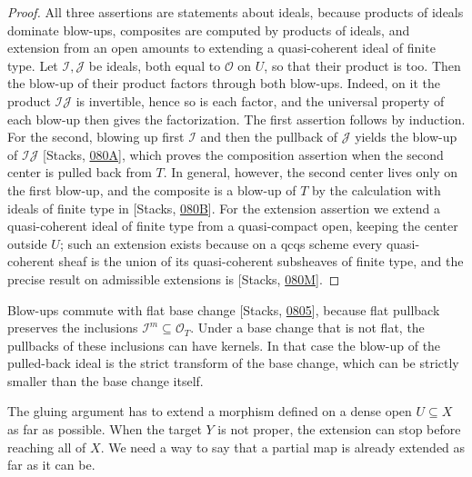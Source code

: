 \documentclass[11pt]{article}
\begin{document}
\begin{proof}[{Proof}]\label{bp36}%
All three assertions are statements about ideals, because products of ideals dominate blow-ups, composites are computed by products of ideals, and extension from an open amounts to extending a quasi-coherent ideal of finite type. Let \(\mathcal I,\mathcal J\) be ideals, both equal to \(\mathcal O\) on \(U\), so that their product is too. Then the blow-up of their product factors through both blow-ups. Indeed, on it the product \(\mathcal I\mathcal J\) is invertible, hence so is each factor, and the universal property of each blow-up then gives the factorization. The first assertion follows by induction. For the second, blowing up first \(\mathcal I\) and then the pullback of \(\mathcal J\) yields the blow-up of \(\mathcal I\mathcal J\) [Stacks, \href{https://stacks.math.columbia.edu/tag/080A}{080A}], which proves the composition assertion when the second center is pulled back from \(T\). In general, however, the second center lives only on the first blow-up, and the composite is a blow-up of \(T\) by the calculation with ideals of finite type in [Stacks, \href{https://stacks.math.columbia.edu/tag/080B}{080B}]. For the extension assertion we extend a quasi-coherent ideal of finite type from a quasi-compact open, keeping the center outside \(U\); such an extension exists because on a qcqs scheme every quasi-coherent sheaf is the union of its quasi-coherent subsheaves of finite type, and the precise result on admissible extensions is [Stacks, \href{https://stacks.math.columbia.edu/tag/080M}{080M}].
\end{proof}

\label{bp37}%
Blow-ups commute with flat base change [Stacks, \href{https://stacks.math.columbia.edu/tag/0805}{0805}], because flat pullback preserves the inclusions \(\mathcal I^m\subseteq\mathcal O_T\). Under a base change that is not flat, the pullbacks of these inclusions can have kernels. In that case the blow-up of the pulled-back ideal is the strict transform of the base change, which can be strictly smaller than the base change itself.

The gluing argument has to extend a morphism defined on a dense open \(U\subseteq X\) as far as possible. When the target \(Y\) is not proper, the extension can stop before reaching all of \(X\). We need a way to say that a partial map is already extended as far as it can be.
\end{document}
